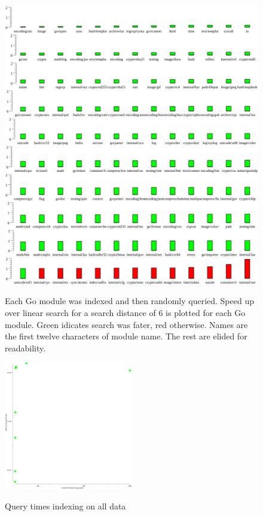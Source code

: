 \begin{figure}
    \includegraphics[width=\textwidth]{example6.png}
    \label{dist6plot}
    \centering
    \caption{Each Go module was indexed and then randomly queried.
    Speed up over linear search for a search distance of $6$ is plotted for each Go module.
    Green idicates search was fater, red otherwise.
    Names are the first twelve characters of module name.
    The rest are elided for readability.}
\end{figure}
\begin{figure}
    \includegraphics[width=0.5\textwidth]{alldat.png}
    \label{allplot}
    \centering 
    \caption{Query times indexing on all data}
\end{figure}